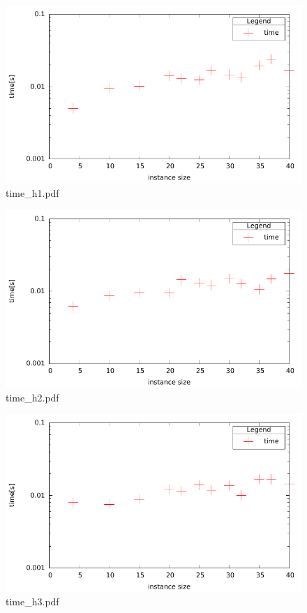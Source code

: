 \documentclass[12pt,a4paper]{article}
\begin{document}
\begin{figure}[H]
\caption{time\_h1.pdf }
\includegraphics{./time_h1.pdf}
\end{figure}

\begin{figure}[H]
\caption{time\_h2.pdf }
\includegraphics{./time_h2.pdf}
\end{figure}

\begin{figure}[H]
\caption{time\_h3.pdf }
\includegraphics{./time_h3.pdf}
\end{figure}
\end{document}
